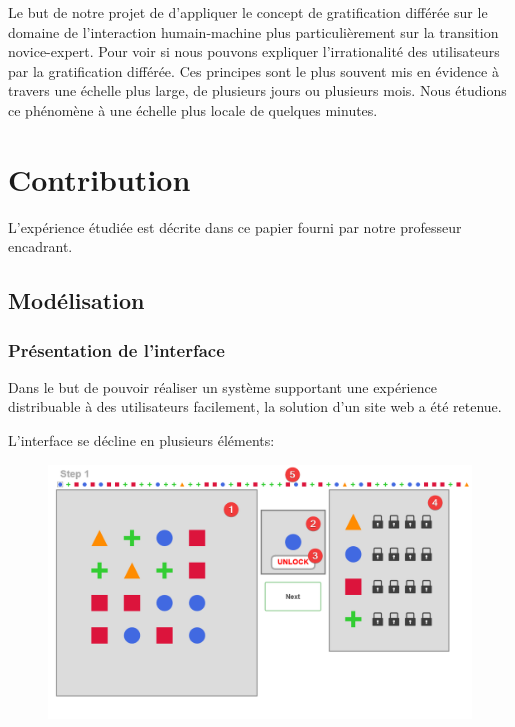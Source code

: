 \documentclass[a4paper, 12pt]{report}
\begin{document}
    Le but de notre projet de d'appliquer le concept de gratification différée sur le domaine de 
    l'interaction humain-machine plus particulièrement sur la transition novice-expert.
    Pour voir si nous pouvons expliquer l'irrationalité des utilisateurs par la gratification différée. Ces principes sont le plus souvent mis en évidence à travers une échelle plus large, de plusieurs jours ou plusieurs mois. Nous étudions ce phénomène à une échelle plus locale de quelques minutes.
    
    \chapter{Contribution}
    L'expérience étudiée est décrite dans ce papier\cite{bailly} fourni par notre professeur encadrant. 
    \section{Modélisation}
        \subsection{Présentation de l'interface}
        Dans le but de pouvoir réaliser un système supportant une expérience distribuable à des utilisateurs facilement, la solution d'un site web a été retenue.
        
        L'interface se décline en plusieurs éléments:
        \begin{figure}[H]
            \centering
            \includegraphics[width=1\textwidth]{img/annotedScreen.png}
        \end{figure}
        
\end{document}
